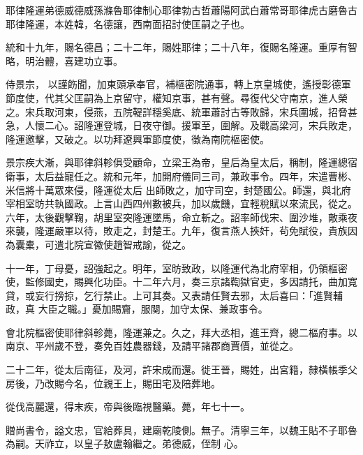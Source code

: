 
\begin{pinyinscope}

 耶律隆運弟德威德威孫滌魯耶律制心耶律勃古哲蕭陽阿武白蕭常哥耶律虎古磨魯古耶律隆運，本姓韓，名德讓，西南面招討使匡嗣之子也。



 統和十九年，賜名德昌；二十二年，賜姓耶律；二十八年，復賜名隆運。重厚有智略，明治體，喜建功立事。



 侍景宗，
 以謹飭聞，加東頭承奉官，補樞密院通事，轉上京皇城使，遙授彰德軍節度使，代其父匡嗣為上京留守，權知京事，甚有聲。尋復代父守南京，進人榮之。宋兵取河東，侵燕，五院鞮詳穩奚底、統軍蕭討古等敗歸，宋兵圍城，招脅甚急，人懷二心。詔隆運登城，日夜守御。援軍至，圍解。及戰高梁河，宋兵敗走，隆運邀擊，又破之。以功拜遼興軍節度使，徵為南院樞密使。



 景宗疾大漸，與耶律斜軫俱受顧命，立梁王為帝，皇后為皇太后，稱制，隆運總宿衛事，太后益寵任之。統和元年，加開府儀同三司，兼政事令。四年，宋遣曹彬、米信將十萬眾來侵，隆運從太后
 出師敗之，加守司空，封楚國公。師還，與北府宰相室昉共執國政。上言山西四州數被兵，加以歲饑，宜輕稅賦以來流民，從之。六年，太後觀擊鞠，胡里室突隆運墜馬，命立斬之。詔率師伐宋、圍沙堆，敵乘夜來襲，隆運嚴軍以待，敗走之，封楚王。九年，復言燕人挾奸，茍免賦役，貴族因為囊橐，可遣北院宣徽使趙智戒諭，從之。



 十一年，丁母憂，詔強起之。明年，室昉致政，以隆運代為北府宰相，仍領樞密使，監修國史，賜興化功臣。十二年六月，奏三京諸鞫獄官吏，多因請托，曲加寬貸，或妄行搒掠，乞行禁止。上可其奏。又表請任賢去邪，太后喜曰：「進賢輔政，真
 大臣之職。」憂加賜齎，服闋，加守太保、兼政事令。



 會北院樞密使耶律斜軫薨，隆運兼之。久之，拜大丞相，進王齊，總二樞府事。以南京、平州歲不登，奏免百姓農器錢，及請平諸郡商賈價，並從之。



 二十二年，從太后南征，及河，許宋成而還。徙王晉，賜姓，出宮籍，隸橫帳季父房後，乃改賜今名，位親王上，賜田宅及陪葬地。



 從伐高麗還，得末疾，帝與後臨視醫藥。薨，年七十一。



 贈尚書令，謚文忠，官給葬具，建廟乾陵側。無子。清寧三年，以魏王貼不子耶魯為嗣。天祚立，以皇子敖盧翰繼之。弟德威，侄制
 心。




\end{pinyinscope}
